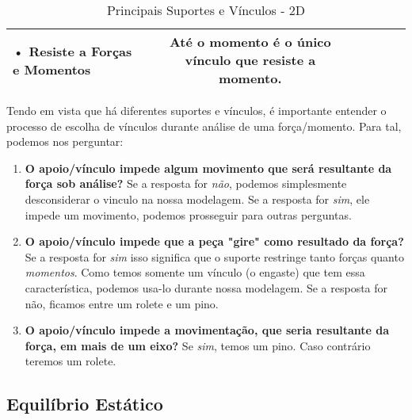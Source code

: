 \documentclass{article}
\begin{document}
\begin{table}[h]
\begin{tabular}{|l|c|c|c|l|l|}
                            \begin{minipage}{.1\columnwidth}
                                \tiny
                                • Resiste a \textbf{Forças} e \textbf{Momentos}
                            \end{minipage}&

                            \begin{minipage}{.1\columnwidth}
                                \vspace{5px}
                                \tiny
                                Até o momento é o único vínculo que resiste a momento.
                                \vspace{5px}
                            \end{minipage} \\ \hline

                \end{tabular}
                \caption{Principais Suportes e Vínculos - 2D}
            \end{table}

            Tendo em vista que há diferentes suportes e vínculos, é importante entender o processo de escolha de vínculos durante análise de uma força/momento. Para tal, podemos nos perguntar:
            \begin{enumerate}
                \item \textbf{O apoio/vínculo impede algum movimento que será resultante da força sob análise?} Se a resposta for \emph{não}, podemos simplesmente desconsiderar o vinculo na nossa
                modelagem. Se a resposta for \emph{sim}, ele impede um movimento, podemos prosseguir para outras perguntas.
                \item \textbf{O apoio/vínculo impede que a peça "gire" como resultado da força?} Se a resposta for \emph{sim} isso significa que o suporte restringe tanto forças quanto
                \emph{momentos}. Como temos somente um vínculo (o engaste) que tem essa característica, podemos usa-lo durante nossa modelagem. Se a resposta for não, ficamos entre um rolete e um pino.
                \item \textbf{O apoio/vínculo impede a movimentação, que seria resultante da força, em mais de um eixo?} Se \emph{sim}, temos um pino. Caso contrário teremos um rolete.
            \end{enumerate}

        \subsection{Equilíbrio Estático}
\end{document}
